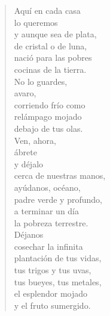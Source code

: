 \documentclass[12pt]{article}
\begin{document}
\begin{verse}
Aquí en cada casa\\
lo queremos\\
y aunque sea de plata,\\
de cristal o de luna,\\
nació para las pobres\\
cocinas de la tierra.\\
No lo guardes,\\
avaro,\\
corriendo frío como\\
relámpago mojado\\
debajo de tus olas.\\
Ven, ahora,\\
ábrete\\
y déjalo\\
cerca de nuestras manos,\\
ayúdanos, océano,\\
padre verde y profundo,\\
a terminar un día\\
la pobreza terrestre.\\
Déjanos\\
cosechar la infinita\\
plantación de tus vidas,\\
tus trigos y tus uvas,\\
tus bueyes, tus metales,\\
el esplendor mojado\\
y el fruto sumergido.  


\end{verse}
\end{document}
